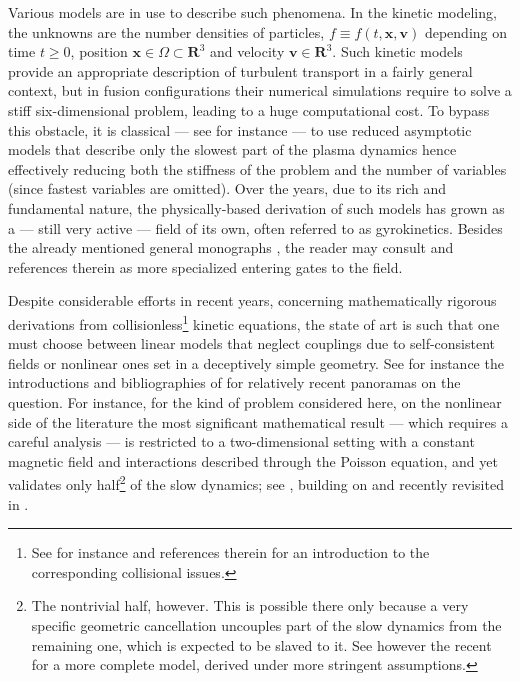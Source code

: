 \documentclass[JEP,XML,SOM,Unicode]{cedram}
\theoremstyle{plain}
\theoremstyle{definition}
\newcommand\R{\mathbf R}
\newcommand\bfv{{\boldsymbol v}}
\newcommand\bfx{{\boldsymbol x}}
\begin{document}
Various models are in use to describe such phenomena. In the kinetic modeling, the unknowns are the number densities of particles, $f\equiv f(t,\bfx,\bfv)$ depending on time $t\geq 0$, position $\bfx\in\Omega\subset \R^3$ and velocity $\bfv\in\R^3$. Such kinetic models provide an appropriate description of turbulent transport in a fairly general context, but in fusion configurations their numerical simulations require to solve a stiff six-dimensional problem, leading to a huge computational cost. To bypass this obstacle, it is classical --- see for instance \cite{Garbet-et-al_2010} --- to use reduced asymptotic models that describe only the slowest part of the plasma dynamics hence effectively reducing both the stiffness of the problem and the number of variables (since fastest variables are omitted). Over the years, due to its rich and fundamental nature, the physically-based derivation of such models has grown as a --- still very active --- field of its own, often referred to as gyrokinetics. Besides the already mentioned general monographs \cite{bellan_2006_fundamentals,chen_introduction,freidberg2008plasma,haz_mei_03,miyamoto_2006_plasma, piel2010plasma}, the reader may consult \cite{Krommes,bri_hahm_07,Matteo-PhD,Scott_gyrokinetic,PDFF} and references therein as more specialized entering gates to the field.

Despite considerable efforts in recent years, concerning mathematically rigorous derivations from collisionless\footnote{See for instance \cite{herda_2016_massless,herda_2016_anisotropic} and references therein for an introduction to the corresponding collisional issues.} kinetic equations, the state of art is such that one must choose between linear models that neglect couplings due to self-consistent fields or nonlinear ones set in a deceptively simple geometry. See for instance the introductions and bibliographies of \cite{HanKwan_PhD,Lutz_PhD,Herda_PhD} for relatively recent panoramas on the question. For instance, for the kind of problem considered here, on the nonlinear side of the literature the most significant mathematical result --- which requires a careful analysis --- is restricted to a two-dimensional setting with a constant magnetic field and interactions described through the Poisson equation, and yet validates only half\footnote{The nontrivial half, however. This is possible there only because a very specific geometric cancellation uncouples part of the slow dynamics from the remaining one, which is expected to be slaved to it. See however the recent \cite{Bostan_2D-VP} for a more complete model, derived under more stringent assumptions.} of the slow dynamics; see \cite{laure0}, building on \cite{gol_lsr_99} and recently revisited in \cite{Miot-2D-gyrokinetic}.
\end{document}
